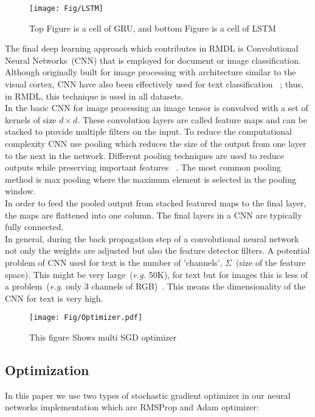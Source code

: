 \documentclass[sigconf, final]{acmart}
\begin{document}
\begin{figure}[b]
\vspace{-0.15in}
\centering
\texttt{[image: Fig/LSTM]}
\vspace{-0.15in}
\caption{Top Figure is a cell of GRU, and bottom Figure is a cell of LSTM}\label{fig:LSTM}

\end{figure}%

The final deep learning approach which contributes in RMDL is  Convolutional Neural Networks~(CNN) that is employed for  document or image classification. Although originally built for image processing with architecture similar to the visual cortex, CNN have also been effectively used for  text classification ~\cite{lecun1998gradient}; thus, in RMDL, this technique is used in all datasets. \\ In the basic CNN for image processing an image tensor is convolved with a set of kernels of size $d \times d$. These convolution layers are called feature maps and can be stacked to provide multiple filters on the input. To reduce the computational complexity CNN use pooling which reduces the size of the output from one layer to the next in the network. Different pooling techniques are used to reduce outputs while preserving important features ~\cite{scherer2010evaluation}. The most common pooling method is max pooling where the maximum element is selected in the pooling window.\\ In order to feed the pooled output from stacked featured maps to the final layer, the maps are flattened into one column. The final layers in a CNN are typically fully connected.\\
In general, during the back propagation step of a convolutional neural network not only the weights are adjusted but also the feature detector filters. A potential problem of CNN used for text is the number of 'channels', $\Sigma$~(size of the feature space). This might be very large~(\textit{e.g.} 50K), for text but for images this is less of a problem~(\textit{e.g.} only 3 channels of RGB)~\cite{johnson2014effective}. This means the dimensionality of the CNN for text is very high.

\begin{figure}[t]
\centering

\texttt{[image: Fig/Optimizer.pdf]}
\caption{This figure Shows multi SGD optimizer }\label{Optimizer}
\vspace{-0.15in}
\end{figure}\subsection{Optimization}\label{subsec:Optimization}
In this paper we use two types of stochastic gradient optimizer in our neural networks implementation which are RMSProp  and Adam optimizer:
\end{document}
